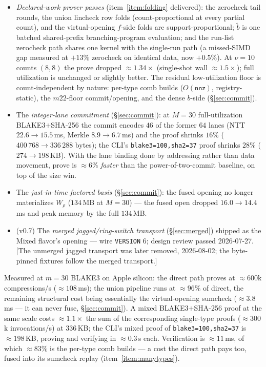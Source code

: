 \documentclass[11pt]{article}
\newcommand{\nnz}{\mathsf{nnz}}
\newcommand{\code}[1]{\texttt{#1}}
\theoremstyle{definition}
\begin{document}
\begin{itemize}[nosep]
  \item \emph{Declared-work prover passes}
        (item~\ref{item:folding} delivered): the zerocheck tail rounds,
        the union lincheck row folds (count-proportional at every
        partial count), and the virtual-opening $f$-side folds are
        support-proportional; $\tilde b$ is one batched shared-prefix
        branching-program evaluation; and the run-list zerocheck path
        shares one kernel with the single-run path (a missed-SIMD gap
        measured at $+13\%$ zerocheck on identical data, now
        $+0.5\%$). At $\nu = 10$ counts $(8, 8)$ the prove dropped
        $\approx 1.34\times$ (single-shot wall $\approx 1.5\times$);
        full utilization is unchanged or slightly better. The residual
        low-utilization floor is count-independent by nature: per-type
        comb builds ($O(\nnz)$, registry-static), the $m22$-floor
        commit/opening, and the dense $b$-side (\S\ref{sec:commit}).
  \item The \emph{integer-lane commitment} (\S\ref{sec:commit}): at
        $M = 30$ full-utilization BLAKE3$+$SHA-256 the commit encodes
        $46$ of the former $64$ lanes (NTT $22.6 \to 15.5$\,ms, Merkle
        $8.9 \to 6.7$\,ms) and the proof shrinks $16\%$
        ($400\,768 \to 336\,288$ bytes); the CLI's
        \code{blake3=100,sha2=37} proof shrinks $28\%$
        ($274 \to 198$\,KB). With the lane binding done by addressing
        rather than data movement, prove is $\approx 6\%$ \emph{faster}
        than the power-of-two-commit baseline, on top of the size win.
  \item The \emph{just-in-time factored basis} (\S\ref{sec:commit}):
        the fused opening no longer materializes $W_\rho$ ($134$\,MB at
        $M = 30$) --- the fused open dropped $16.0 \to 14.4$\,ms and
        peak memory by the full $134$\,MB.
  \item (v0.7) The \emph{merged jagged/ring-switch transport}
        (\S\ref{sec:merged}) shipped as the Mixed flavor's opening ---
        wire \code{VERSION} 6; design review passed 2026-07-27. [The
        unmerged jagged transport was later removed, 2026-08-02; the
        byte-pinned fixtures follow the merged transport.]
\end{itemize}

Measured at $m = 30$ BLAKE3 on Apple silicon: the direct path proves at
$\approx 600$k compressions/s ($\approx 108$\,ms); the union pipeline
runs at $\approx 96\%$ of direct, the remaining structural cost being
essentially the virtual-opening sumcheck ($\approx 3.8$\,ms --- it can
never fuse, \S\ref{sec:commit}). A mixed BLAKE3$+$SHA-256 proof at the
same scale costs $\approx 1.1\times$ the sum of the corresponding
single-type proofs ($\approx 300$k invocations/s) at $336$\,KB; the
CLI's mixed proof of \code{blake3=100,sha2=37} is $\approx 198$\,KB,
proving and verifying in $\approx 0.3$\,s each. Verification is
$\approx 11$\,ms, of which $\approx 83\%$ is the per-type comb builds
--- a cost the direct path pays too, fused into its sumcheck replay
(item~\ref{item:manytypes}).
\end{document}
